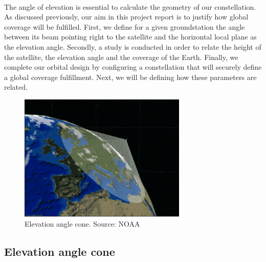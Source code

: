 \paragraph{ }

The angle of elevation is essential to calculate the geometry of our constellation. As discussed previously, our aim in this project report is to justify how global coverage will be fulfilled. First, we define for a given groundstation the angle between its beam pointing right to the satellite and the horizontal local plane as the elevation angle. Secondly, a study is conducted in order to relate the height of the satellite, the elevation angle and the coverage of the Earth. Finally, we complete our orbital design by configuring a constellation that will securely define a global coverage fulfillment. Next, we will be defining how these parameters are related. 

\begin{figure}[h]
\includegraphics[width=8cm]{noaa}
\centering
\caption{Elevation angle cone. Source: NOAA}
\end{figure}

\subsection{Elevation angle cone}

\paragraph{ }

